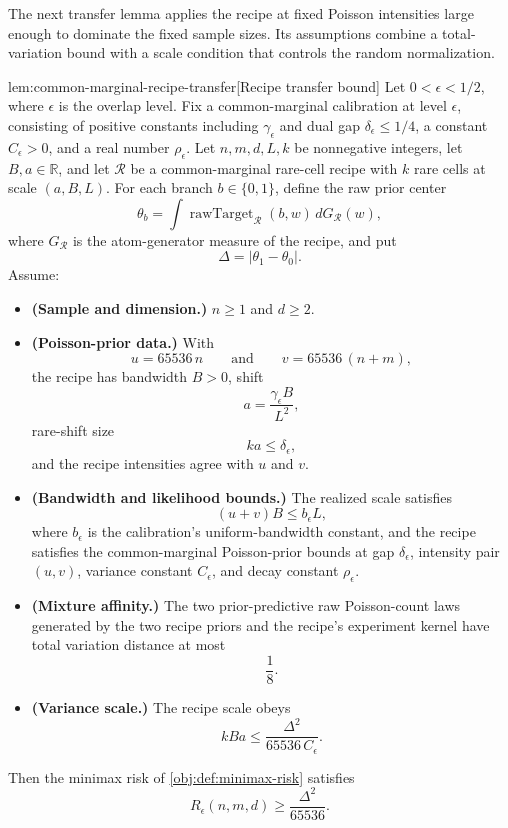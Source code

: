 The next transfer lemma applies the recipe at fixed Poisson intensities large enough to dominate the fixed sample sizes. Its assumptions combine a total-variation bound with a scale condition that controls the random normalization.

\begin{lemmav}{lem:common-marginal-recipe-transfer}[Recipe transfer bound]
Let \(0<\epsilon<1/2\), where \(\epsilon\) is the overlap level.  Fix a common-marginal calibration at level \(\epsilon\), consisting of positive constants including \(\gamma_\epsilon\) and dual gap \(\delta_\epsilon\le 1/4\), a constant \(C_\epsilon>0\), and a real number \(\rho_\epsilon\).  Let \(n,m,d,L,k\) be nonnegative integers, let \(B,a\in\mathbb R\), and let \(\mathcal R\) be a common-marginal rare-cell recipe with \(k\) rare cells at scale \((a,B,L)\).  For each branch \(b\in\{0,1\}\), define the raw prior center
\[
\theta_b=\int \operatorname{rawTarget}_{\mathcal R}(b,w)\,dG_{\mathcal R}(w),
\]
where \(G_{\mathcal R}\) is the atom-generator measure of the recipe, and put
\[
\Delta=|\theta_1-\theta_0|.
\]
Assume:
\begin{itemize}
\item \textbf{(Sample and dimension.)} \(n\ge 1\) and \(d\ge 2\).
\item \textbf{(Poisson-prior data.)} With
\[
u=65536\,n
\qquad\text{and}\qquad
v=65536\,(n+m),
\]
the recipe has bandwidth \(B>0\), shift
\[
a=\frac{\gamma_\epsilon B}{L^2},
\]
rare-shift size
\[
ka\le \delta_\epsilon,
\]
and the recipe intensities agree with \(u\) and \(v\).
\item \textbf{(Bandwidth and likelihood bounds.)} The realized scale satisfies
\[
(u+v)B\le b_\epsilon L,
\]
where \(b_\epsilon\) is the calibration's uniform-bandwidth constant, and the recipe satisfies the common-marginal Poisson-prior bounds at gap \(\delta_\epsilon\), intensity pair \((u,v)\), variance constant \(C_\epsilon\), and decay constant \(\rho_\epsilon\).
\item \textbf{(Mixture affinity.)} The two prior-predictive raw Poisson-count laws generated by the two recipe priors and the recipe's experiment kernel have total variation distance at most
\[
\frac18 .
\]
\item \textbf{(Variance scale.)} The recipe scale obeys
\[
kBa\le \frac{\Delta^2}{65536\,C_\epsilon}.
\]
\end{itemize}
Then the minimax risk of \cref{obj:def:minimax-risk} satisfies
\[
R_\epsilon(n,m,d)\ge \frac{\Delta^2}{65536}.
\]
\end{lemmav}

